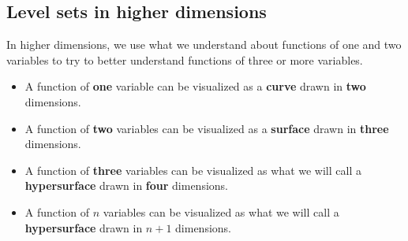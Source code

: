 \documentclass{ximera}
\begin{document}


\subsection{Level sets in higher dimensions}

In higher dimensions, we use what we understand about 
functions of one and two variables to try to better understand functions 
of three or more variables. 

\begin{itemize}
  \item A function of \textbf{one} variable can be visualized as a \textbf{curve} drawn
    in \textbf{two} dimensions.
  \item A function of \textbf{two} variables can be visualized as a \textbf{surface}
    drawn in \textbf{three} dimensions.
  \item A function of \textbf{three} variables can be visualized as what we will call a
    \textbf{hypersurface} drawn in \textbf{four} dimensions.
  \item A function of \textbf{$n$} variables can be visualized as what we will call a
    \textbf{hypersurface} drawn in \textbf{$n+1$} dimensions.
\end{itemize}
\end{document}
